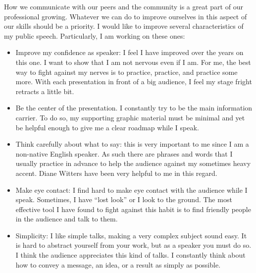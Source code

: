 \documentclass[11pt]{article}
\begin{document}
How we communicate with our peers and the community is a great part of our professional growing. 
 Whatever we can do to improve ourselves in this aspect of our skills should be a priority. 
 I would like to improve several characteristics of my public speech. Particularly, I am working
on these ones:

\begin{itemize}
  \item Improve my confidence as speaker: I feel I have improved over the years on this one. 
        I want to show that I am not nervous even if I am. For me, the best way to fight against
        my nerves is to practice, practice, and practice some more. With each presentation in front 
        of a big audience, I feel my stage fright retracts a little bit. 

  \item Be the center of the presentation. I constantly try to be the main information carrier. 
        To do so, my supporting graphic material must be minimal and yet be helpful enough
        to give me a clear roadmap while I speak.

  \item Think carefully about what to say: this is very important to me since I am a non-native
        English speaker. As such there are phrases and words that I usually practice in advance
        to help the audience against my sometimes heavy accent. Diane Witters have been very helpful
        to me in this regard. 

  \item Make eye contact: I find hard to make eye contact with the audience while I speak. Sometimes,
        I have ``lost look'' or I look to the ground. The most effective tool I have found to fight against
        this habit is to find friendly people in the audience and talk to them. 

  \item Simplicity: I like simple talks, making a very complex subject sound easy. It is hard to abstract
        yourself from your work, but as a speaker you must do so. I think the audience appreciates 
        this kind of talks. I constantly think about how to convey a message, an idea, or a result 
        as simply as possible.  
\end{itemize}
\end{document}
